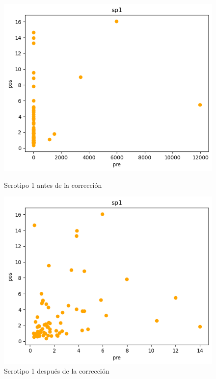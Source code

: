 \begin{figure}[h]
    \centering
    \begin{minipage}{0.45\textwidth}
        \centering
        \includegraphics[width=\linewidth]{Graphics/sp1d.png}
        \caption{Serotipo 1 antes de la corrección}
        \label{fig:sp1d}
    \end{minipage}%
    \hfill
    \begin{minipage}{0.45\textwidth}
        \centering
        \includegraphics[width=\linewidth]{Graphics/sp1.png}
        \caption{Serotipo 1 después de la corrección}
        \label{fig:sp1}
    \end{minipage}

\end{figure}


